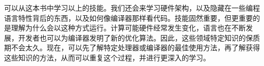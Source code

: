 可以从这本书中学习以上的技能。我们还会来学习硬件架构，以及隐藏在一些编程语言特性背后的东西，以及如何像编译器那样看代码。技能固然重要，但更重要的是理解为什么会以这种方式运行。计算可能硬件经常发生变化，语言也在不断发展，开发者也可以为编译器发明了新的优化算法。因此，这些领域特定知识的保质期不会太久。现在，可以先了解特定处理器或编译器的最佳使用方法，再了解获得这些知识的方法，从而可以重复这个过程，并进行更深入的学习。
































